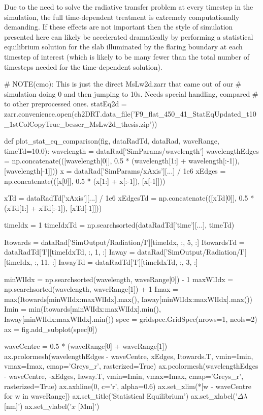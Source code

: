 Due to the need to solve the radiative transfer problem at every timestep in the \Radyn{} simulation, the full time-dependent treatment is extremely computationally demanding.
If these effects are not important then the style of simulation presented here can likely be accelerated dramatically by performing a statistical equilibrium solution for the slab illuminated by the flaring boundary at each timestep of interest (which is likely to be many fewer than the total number of timesteps needed for the time-dependent solution).

\begin{pycode}[2DRT]
# NOTE(cmo): This is just the direct MsLw2d.zarr that came out of our
# simulation doing 0 and then jumping to 10s. Needs special handling, compared
# to other preprocessed ones.
statEq2d = zarr.convenience.open(ch2DRT.data_file('F9_flat_450_41_StatEqUpdated_t10_1stColCopyTrue_besser_MsLw2d_thesis.zip'))

def plot_stat_eq_comparison(fig, dataRadTd, dataRad, waveRange, timeTd=10.0):
    wavelength = dataRad['SimParams/wavelength']
    wavelengthEdges = np.concatenate(([wavelength[0]], 0.5 * (wavelength[1:] + wavelength[:-1]), [wavelength[-1]]))
    x = dataRad['SimParams/xAxis'][...] / 1e6
    xEdges = np.concatenate(([x[0]], 0.5 * (x[1:] + x[:-1]), [x[-1]]))

    xTd = dataRadTd['xAxis'][...] / 1e6
    xEdgesTd = np.concatenate(([xTd[0]], 0.5 * (xTd[1:] + xTd[:-1]), [xTd[-1]]))

    timeIdx = 1
    timeIdxTd = np.searchsorted(dataRadTd['time'][...], timeTd)

    Itowards = dataRad['SimOutput/Radiation/I'][timeIdx, :, 5, :]
    ItowardsTd = dataRadTd['I'][timeIdxTd, :, 1, :]
    Iaway = dataRad['SimOutput/Radiation/I'][timeIdx, :, 11, :]
    IawayTd = dataRadTd['I'][timeIdxTd, :, 3, :]

    minWlIdx = np.searchsorted(wavelength, waveRange[0]) - 1
    maxWlIdx = np.searchsorted(wavelength, waveRange[1]) + 1
    Imax = max(Itowards[minWlIdx:maxWlIdx].max(), Iaway[minWlIdx:maxWlIdx].max())
    Imin = min(Itowards[minWlIdx:maxWlIdx].min(), Iaway[minWlIdx:maxWlIdx].min())
    spec = gridspec.GridSpec(nrows=1, ncols=2)
    ax = fig.add_subplot(spec[0])

    waveCentre = 0.5 * (waveRange[0] + waveRange[1])
    ax.pcolormesh(wavelengthEdges - waveCentre, xEdges, Itowards.T, vmin=Imin, vmax=Imax, cmap='Greys_r', rasterized=True)
    ax.pcolormesh(wavelengthEdges - waveCentre, -xEdges, Iaway.T, vmin=Imin, vmax=Imax, cmap='Greys_r', rasterized=True)
    ax.axhline(0, c='r', alpha=0.6)
    ax.set_xlim(*[w - waveCentre for w in waveRange])
    ax.set_title('Statistical Equilibrium')
    ax.set_xlabel('$\Delta\lambda$ [nm]')
    ax.set_ylabel('$x$ [Mm]')


\end{pycode}
